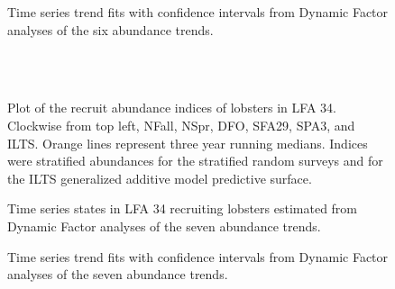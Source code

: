 \documentclass[11pt]{article}
\newcommand{\e}{/SpinDr/backup/bio_data/bio.lobster/figures/LFA3438Framework2019/} %
\begin{document}
\begin{figure}
    \centering
        \caption{Time series trend fits with confidence intervals from Dynamic Factor analyses of the six abundance trends.}

    \end{figure}

\begin{landscape}
\begin{figure}
        \centering
    \\
                \\
        
         \caption{Plot of the recruit abundance indices of lobsters in LFA 34. Clockwise from top left, NFall, NSpr, DFO, SFA29, SPA3, and ILTS.
         Orange lines represent three year running medians. Indices were stratified abundances for the stratified random surveys and for the ILTS generalized additive model predictive surface.}
        \end{figure}
\end{landscape}

   \begin{figure}
    \centering
        \caption{Time series states in LFA 34 recruiting lobsters estimated from Dynamic Factor analyses of the seven abundance trends.}

    \end{figure}

\begin{figure}
    \centering
        \caption{Time series trend fits with confidence intervals from Dynamic Factor analyses of the seven abundance trends.}

    \end{figure}
\end{document}
